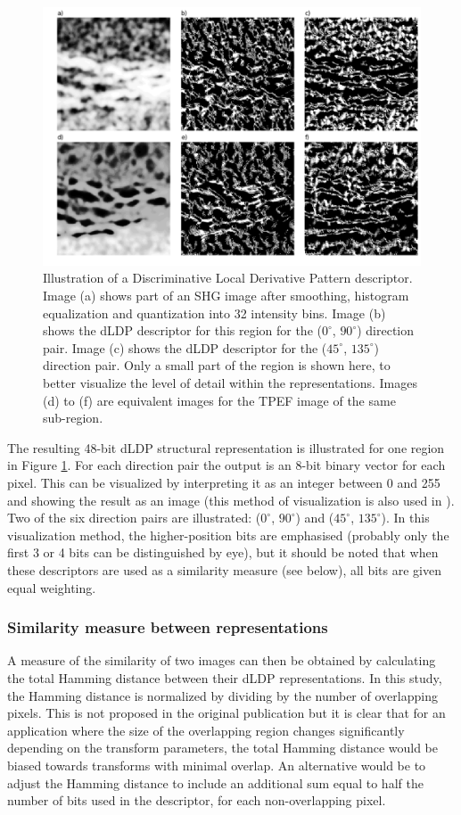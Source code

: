 \documentclass{report}
\begin{document}
\begin{figure}
\centering
\includegraphics[width=5.5in]{LDP_visualization_zoomin.pdf}
\caption{Illustration of a Discriminative Local Derivative Pattern descriptor. Image (a) shows part of an SHG image after smoothing, histogram equalization and quantization into 32 intensity bins. Image (b) shows the dLDP descriptor for this region for the ($0^{\circ}$, $90^{\circ}$) direction pair. Image (c) shows the dLDP descriptor for the ($45^{\circ}$, $135^{\circ}$) direction pair. Only a small part of the region is shown here, to better visualize the level of detail within the representations. Images (d) to (f) are equivalent images for the TPEF image of the same sub-region.}
\label{fig:dLDP_vis}
\end{figure}
The resulting 48-bit dLDP structural representation is illustrated for one region in Figure \ref{fig:dLDP_vis}. For each direction pair the output is an 8-bit binary vector for each pixel. This can be visualized by interpreting it as an integer between 0 and 255 and showing the result as an image (this method of visualization is also used in \cite{jiang2017fast}). Two of the six direction pairs are illustrated: ($0^{\circ}$, $90^{\circ}$) and ($45^{\circ}$, $135^{\circ}$). In this visualization method, the higher-position bits are emphasised (probably only the first 3 or 4 bits can be distinguished by eye), but it should be noted that when these descriptors are used as a similarity measure (see below), all bits are given equal weighting.

\subsubsection{Similarity measure between representations}
A measure of the similarity of two images can then be obtained by calculating the total Hamming distance between their dLDP representations. In this study, the Hamming distance is normalized by dividing by the number of overlapping pixels. This is not proposed in the original publication but it is clear that for an application where the size of the overlapping region changes significantly depending on the transform parameters, the total Hamming distance would be biased towards transforms with minimal overlap. An alternative would be to adjust the Hamming distance to include an additional sum equal to half the number of bits used in the descriptor, for each non-overlapping pixel. 
\end{document}
